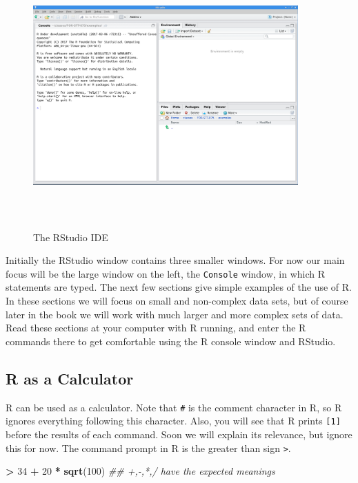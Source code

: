 \documentclass[]{krantz}
\makeatletter
\newenvironment{Shaded}{\begin{snugshade}}{\end{snugshade}}
\newcommand{\CommentTok}[1]{\textcolor[rgb]{0.37,0.37,0.37}{\textit{#1}}}
\newcommand{\DecValTok}[1]{\textcolor[rgb]{0.06,0.06,0.06}{#1}}
\newcommand{\KeywordTok}[1]{\textcolor[rgb]{0.27,0.27,0.27}{\textbf{#1}}}
\newcommand{\NormalTok}[1]{#1}
\newcommand{\OperatorTok}[1]{\textcolor[rgb]{0.43,0.43,0.43}{\textbf{#1}}}
\newcommand{\StringTok}[1]{\textcolor[rgb]{0.5,0.5,0.5}{#1}}
\newenvironment{kframe}{%
\medskip{}
\setlength{\fboxsep}{.8em}
 \def\at@end@of@kframe{}%
 \ifinner\ifhmode%
  \def\at@end@of@kframe{\end{minipage}}%
  \begin{minipage}{\columnwidth}%
 \fi\fi%
 \def\FrameCommand##1{\hskip\@totalleftmargin \hskip-\fboxsep
 \colorbox{shadecolor}{##1}\hskip-\fboxsep
     \hskip-\linewidth \hskip-\@totalleftmargin \hskip\columnwidth}%
 \MakeFramed {\advance\hsize-\width
   \@totalleftmargin\z@ \linewidth\hsize
   \@setminipage}}%
 {\par\unskip\endMakeFramed%
 \at@end@of@kframe}
\renewenvironment{Shaded}{\begin{kframe}}{\end{kframe}}
\makeatother
\begin{document}
\begin{figure}
\includegraphics[width=4in,height=4in]{../figures/RStudio} \caption{The RStudio IDE}\label{fig:rstudioPic}
\end{figure}

Initially the RStudio window contains three smaller windows. For now our main focus will be the large window on the left, the \texttt{Console} window, in which R statements are typed. The next few sections give simple examples of the use of R. In these sections we will focus on small and non-complex data sets, but of course later in the book we will work with much larger and more complex sets of data. Read these sections at your computer with R running, and enter the R commands there to get comfortable using the R console window and RStudio.

\hypertarget{r-as-a-calculator}{%
\subsection{R as a Calculator}\label{r-as-a-calculator}}

R can be used as a calculator. Note that \texttt{\#} is the comment character in R, so R ignores everything following this character. Also, you will see that R prints \texttt{{[}1{]}} before the results of each command. Soon we will explain its relevance, but ignore this for now. The command prompt in R is the greater than sign \texttt{\textgreater{}}.

\begin{Shaded}
\begin{Highlighting}[]
\OperatorTok{>}\StringTok{ }\DecValTok{34} \OperatorTok{+}\StringTok{ }\DecValTok{20} \OperatorTok{*}\StringTok{ }\KeywordTok{sqrt}\NormalTok{(}\DecValTok{100}\NormalTok{)  }\CommentTok{## +,-,*,/ have the expected meanings}
\end{Highlighting}
\end{Shaded}
\end{document}
